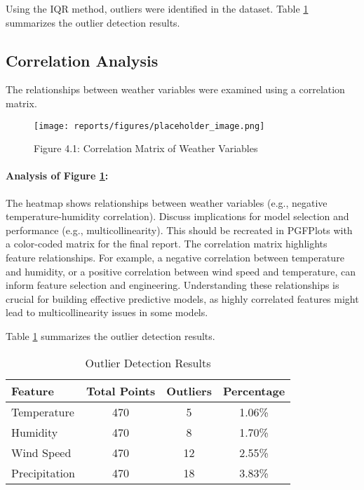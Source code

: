 \documentclass[12pt]{article}
\begin{document}
Using the IQR method, outliers were identified in the dataset. Table \ref{tab:outlier_detection} summarizes the outlier detection results.

\subsection{Correlation Analysis}
\label{subsec:correlation_analysis_results}

The relationships between weather variables were examined using a correlation matrix.

\begin{figure}[H]
    \centering
    \texttt{[image: reports/figures/placeholder\_image.png]} %
    \caption{Figure 4.1: Correlation Matrix of Weather Variables}
    \label{fig:chap4_fig1_correlation_matrix}
\end{figure}

\paragraph{Analysis of Figure \ref{fig:chap4_fig1_correlation_matrix}:}
The heatmap shows relationships between weather variables (e.g., negative temperature-humidity correlation). Discuss implications for model selection and performance (e.g., multicollinearity). This should be recreated in PGFPlots with a color-coded matrix for the final report.
The correlation matrix highlights feature relationships. For example, a negative correlation between temperature and humidity, or a positive correlation between wind speed and temperature, can inform feature selection and engineering. Understanding these relationships is crucial for building effective predictive models, as highly correlated features might lead to multicollinearity issues in some models.

Table \ref{tab:outlier_detection} summarizes the outlier detection results.

\begin{table}[h]
\centering
\caption{Outlier Detection Results}
\label{tab:outlier_detection}
\begin{tabular}{|l|c|c|c|}
\hline
\textbf{Feature} & \textbf{Total Points} & \textbf{Outliers} & \textbf{Percentage} \\
\hline
Temperature & 470 & 5 & 1.06\% \\
\hline
Humidity & 470 & 8 & 1.70\% \\
\hline
Wind Speed & 470 & 12 & 2.55\% \\
\hline
Precipitation & 470 & 18 & 3.83\% \\
\hline
\end{tabular}
\end{table}
\end{document}

